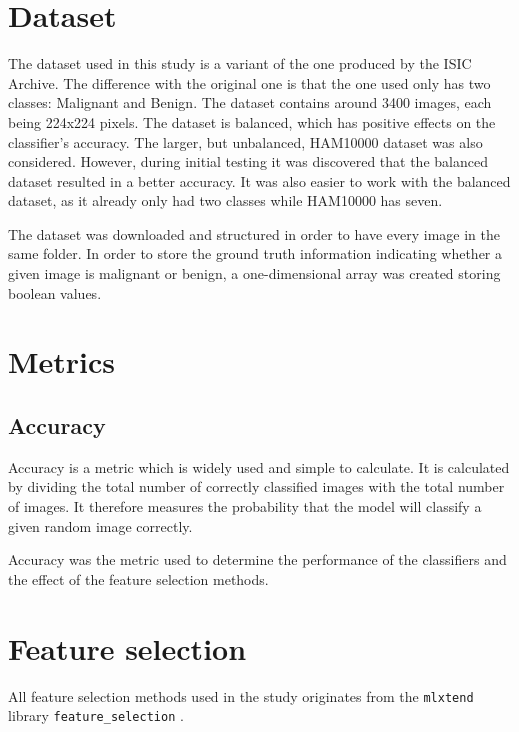 \documentclass{kththesis}
\begin{document}

\section{Dataset}

The dataset used in this study is a variant of the one produced by the ISIC Archive. The difference with the original one is that the one used only has two classes: Malignant and Benign. The dataset contains around 3400 images, each being 224x224 pixels. The dataset is balanced, which has positive effects on the classifier's accuracy. The larger, but unbalanced, HAM10000 dataset was also considered. However, during initial testing it was discovered that the balanced dataset resulted in a better accuracy. It was also easier to work with the balanced dataset, as it already only had two classes while HAM10000 has seven.

The dataset was downloaded and structured in order to have every image in the same folder. In order to store the ground truth information indicating whether a given image is malignant or benign, a one-dimensional array was created storing boolean values.

\section{Metrics}

\subsection{Accuracy}

Accuracy is a metric which is widely used and simple to calculate.
It is calculated by dividing the total number of correctly classified images with the total number of images. 
It therefore measures the probability that the model will classify a given random image correctly. \parencite{takiddin2021artificial}

Accuracy was the metric used to determine the performance of the classifiers and the effect of the feature selection methods.


\section{Feature selection}

All feature selection methods used in the study originates from the \verb|mlxtend| library \verb|feature_selection| \parencite{raschkas_2018_mlxtend}.
\end{document}
